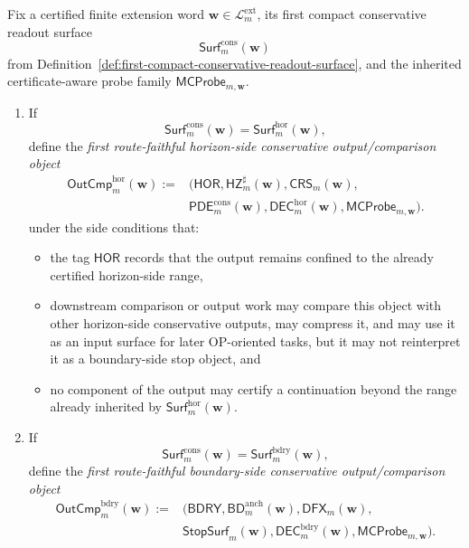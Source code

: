 \begin{definition}
\label{def:first-route-faithful-conservative-output-comparison-layer}
Fix a certified finite extension word \(\mathbf w\in\mathcal L^{\mathrm{ext}}_{m}\), its first compact conservative readout surface
\[
 \mathsf{Surf}^{\mathrm{cons}}_{m}(\mathbf w)
\]
from Definition~\ref{def:first-compact-conservative-readout-surface}, and the inherited certificate-aware probe family \(\mathsf{MCProbe}_{m,\mathbf w}\).
\begin{enumerate}[label=(\roman*)]
 \item If
 \[
 \mathsf{Surf}^{\mathrm{cons}}_{m}(\mathbf w)=\mathsf{Surf}^{\mathrm{hor}}_{m}(\mathbf w),
 \]
 define the \emph{first route-faithful horizon-side conservative output/comparison object}
 \[
 \begin{aligned}
 \mathsf{OutCmp}^{\mathrm{hor}}_{m}(\mathbf w)
 := {}& \bigl(\mathsf{HOR},\mathsf{HZ}^{\sharp}_{m}(\mathbf w),\mathsf{CRS}_{m}(\mathbf w),\\
 &\mathsf{PDE}^{\mathrm{cons}}_{m}(\mathbf w),\mathsf{DEC}^{\mathrm{hor}}_{m}(\mathbf w),\mathsf{MCProbe}_{m,\mathbf w}\bigr).
 \end{aligned}
 \]
 under the side conditions that:
 \begin{itemize}[leftmargin=2em]
 \item the tag \(\mathsf{HOR}\) records that the output remains confined to the already certified horizon-side range,
 \item downstream comparison or output work may compare this object with other horizon-side conservative outputs, may compress it, and may use it as an input surface for later OP-oriented tasks, but it may not reinterpret it as a boundary-side stop object, and
 \item no component of the output may certify a continuation beyond the range already inherited by \(\mathsf{Surf}^{\mathrm{hor}}_{m}(\mathbf w)\).
 \end{itemize}
 \item If
 \[
 \mathsf{Surf}^{\mathrm{cons}}_{m}(\mathbf w)=\mathsf{Surf}^{\mathrm{bdry}}_{m}(\mathbf w),
 \]
 define the \emph{first route-faithful boundary-side conservative output/comparison object}
 \[
 \begin{aligned}
 \mathsf{OutCmp}^{\mathrm{bdry}}_{m}(\mathbf w)
 := {}& \bigl(\mathsf{BDRY},\mathsf{BD}^{\mathrm{anch}}_{m}(\mathbf w),\mathsf{DFX}_{m}(\mathbf w),\\
 &\mathsf{StopSurf}_{m}(\mathbf w),\mathsf{DEC}^{\mathrm{bdry}}_{m}(\mathbf w),\mathsf{MCProbe}_{m,\mathbf w}\bigr).

\end{aligned}\]
\end{enumerate}
\end{definition}
